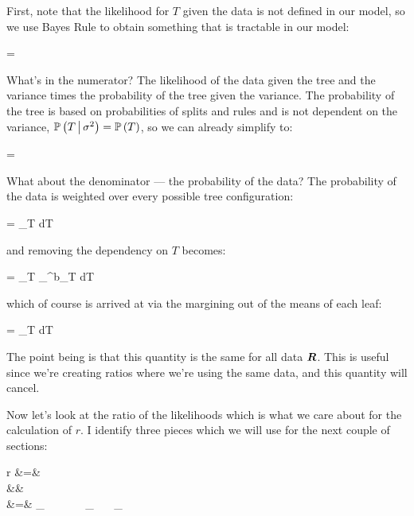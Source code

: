 First, note that the likelihood for $T$ given the data is not defined in our model, so we use Bayes Rule to obtain something that is tractable in our model:

\beqn
{} = 
\eeqn

What's in the numerator? The likelihood of the data given the tree and the variance times the probability of the tree given the variance. The probability of the tree is based on probabilities of splits and rules and is not dependent on the variance, $\mathbb{P}\left(T \, \big| \, \sigma^2\right) = \mathbb{P}\left(T\right)$, so we can already simplify to:

\beqn
{} = 
\eeqn

What about the denominator --- the probability of the data? The probability of the data is weighted over every possible tree configuration:

\beqn
\cprob{\R}{\sigsq} = \int_{T \in {}}   dT
\eeqn

and removing the dependency on $T$ becomes:

\beqn
\cprob{\R}{\sigsq} = \int_{T \in {}} \prod_{}^{b_T} \cprob{\Rlonetonl}{\sigsq}  dT
\eeqn

which of course is arrived at via the margining out of the means of each leaf:

\beqn
\cprob{\R}{\sigsq} = \int_{T \in {}}   dT
\eeqn

The point being is that this quantity is the same for all data $\boldsymbol{R}$. This is useful since we're creating ratios where we're using the same data, and this quantity will cancel.

Now let's look at the ratio of the likelihoods which is what we care about for the calculation of $r$. I identify three pieces which we will use for the next couple of sections:

\beqn
r &=&   \\
&& \quad\quad\quad\quad~~  \\
&=& _{} ~~~\times~~~ _{} ~~~\times {}_{}
\eeqn

